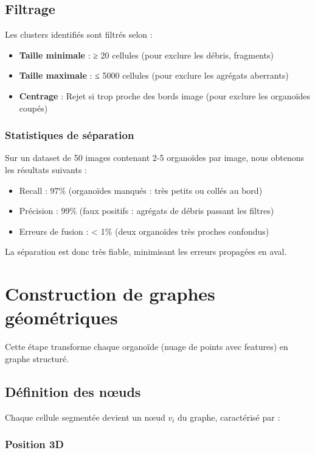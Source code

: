 \subsection{Filtrage}

Les clusters identifiés sont filtrés selon :
\begin{itemize}
    \item \textbf{Taille minimale} : ≥ 20 cellules (pour exclure les débris, fragments)
    \item \textbf{Taille maximale} : ≤ 5000 cellules (pour exclure les agrégats aberrants)
    \item \textbf{Centrage} : Rejet si trop proche des bords image (pour exclure les organoïdes coupés)
\end{itemize}

\subsubsection{Statistiques de séparation}

Sur un dataset de 50 images contenant 2-5 organoïdes par image, nous obtenons les résultats suivants :
\begin{itemize}
    \item Recall : 97\% (organoïdes manqués : très petits ou collés au bord)
    \item Précision : 99\% (faux positifs : agrégats de débris passant les filtres)
    \item Erreurs de fusion : < 1\% (deux organoïdes très proches confondus)
\end{itemize}

La séparation est donc très fiable, minimisant les erreurs propagées en aval.

\section{Construction de graphes géométriques}

Cette étape transforme chaque organoïde (nuage de points avec features) en graphe structuré.

\subsection{Définition des nœuds}

Chaque cellule segmentée devient un nœud $v_i$ du graphe, caractérisé par :

\subsubsection{Position 3D}

